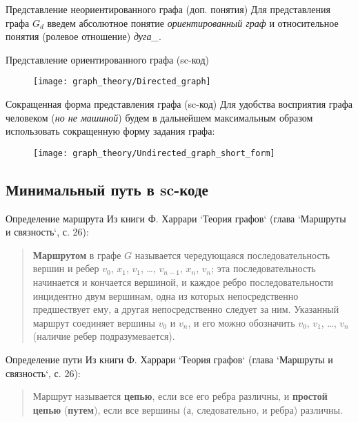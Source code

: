 \begin{frame}{Представление неориентированного графа (доп. понятия)}
  Для представления графа $G_d$ введем абсолютное понятие
  \emph{ориентированный граф} и относительное понятия (ролевое отношение)
  \emph{дуга\_}.
\end{frame}

\begin{frame}{Представление ориентированного графа (sc-код)}
  \begin{figure}
    \centering
    \texttt{[image: graph\_theory/Directed\_graph]}
  \end{figure}
\end{frame}

\begin{frame}{Сокращенная форма представления графа (sc-код)}
  Для удобства восприятия графа человеком (\emph{но не машиной})
  будем в дальнейшем максимальным образом использовать сокращенную
  форму задания графа:
  
  \begin{figure}
    \centering
    \texttt{[image: graph\_theory/Undirected\_graph\_short\_form]}
  \end{figure}
\end{frame}

\subsection{Минимальный путь в sc-коде}

\begin{frame}{Определение маршрута}
  Из книги Ф. Харрари `Теория графов` (глава `Маршруты и связность`, с. 26):
  \begin{quote}
    \textbf{Маршрутом} в графе $G$ называется чередующаяся последовательность
    вершин и ребер $v_0$, $x_1$, $v_1$, …, $v_{n-1}$, $x_n$, $v_n$; эта последовательность
    начинается и кончается вершиной, и каждое ребро последовательности
    инцидентно двум вершинам, одна из которых непосредственно
    предшествует ему, а другая непосредственно следует за
    ним. Указанный маршрут соединяет вершины $v_0$ и $v_n$, и его можно
    обозначить $v_0$, $v_1$, …, $v_n$ (наличие ребер подразумевается).
  \end{quote}
\end{frame}

\begin{frame}{Определение пути}
  Из книги Ф. Харрари `Теория графов` (глава `Маршруты и связность`, с. 26):
  \begin{quote}
    Маршрут называется \textbf{цепью}, если все его ребра различны, и
    \textbf{простой цепью} (\textbf{путем}), если все вершины (а,
    следовательно, и ребра) различны.
  \end{quote}
\end{frame}

